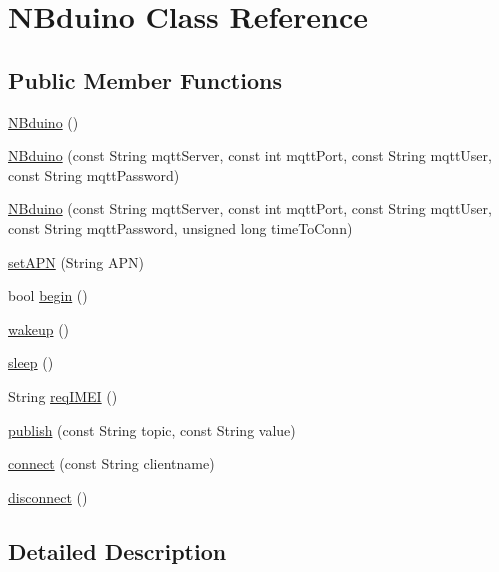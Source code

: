 \hypertarget{class_n_bduino}{}\section{N\+Bduino Class Reference}
\label{class_n_bduino}
\subsection*{Public Member Functions}
\begin{DoxyCompactItemize}
\item 
\mbox{\hyperlink{class_n_bduino_acd7c1c69bffccefc807ff89394732a7d}{N\+Bduino}} ()
\item 
\mbox{\hyperlink{class_n_bduino_af520a0691a464694c224aba7bd1b81f6}{N\+Bduino}} (const String mqtt\+Server, const int mqtt\+Port, const String mqtt\+User, const String mqtt\+Password)
\item 
\mbox{\hyperlink{class_n_bduino_ac3902de83e4e090b90a984d7fd9fd148}{N\+Bduino}} (const String mqtt\+Server, const int mqtt\+Port, const String mqtt\+User, const String mqtt\+Password, unsigned long time\+To\+Conn)
\item 
\mbox{\hyperlink{class_n_bduino_a9a903295305e847b3d68a7a6cc111316}{set\+A\+PN}} (String A\+PN)
\item 
bool \mbox{\hyperlink{class_n_bduino_ae8241f6dcfe492f00f8bef4b5d4b79a0}{begin}} ()
\item 
\mbox{\hyperlink{class_n_bduino_a8e740e7b90e6e75b7dd3b7900ee0dd22}{wakeup}} ()
\item 
\mbox{\hyperlink{class_n_bduino_ac7bf8f7f0552ad2cbda4b3e91a82bfca}{sleep}} ()
\item 
String \mbox{\hyperlink{class_n_bduino_a3d96fbfb52c89cd55e9a7a3f387c6945}{req\+I\+M\+EI}} ()
\item 
\mbox{\hyperlink{class_n_bduino_a1c9526fbb36956b1cd41e33dd9133394}{publish}} (const String topic, const String value)
\item 
\mbox{\hyperlink{class_n_bduino_a6fb245092697af20f39d21d92bfaa91a}{connect}} (const String clientname)
\item 
\mbox{\hyperlink{class_n_bduino_ae013d9c6d18771efa34f9805039a0127}{disconnect}} ()
\end{DoxyCompactItemize}


\subsection{Detailed Description}


